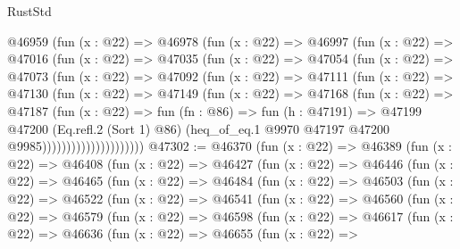 \begin{lexlean}{RustStd}
\begin{coremodule}
                @46959
                  (fun (x : @22) =>
                  @46978
                    (fun (x : @22) =>
                    @46997
                      (fun (x : @22) =>
                      @47016
                        (fun (x : @22) =>
                        @47035
                          (fun (x : @22) =>
                          @47054
                            (fun (x : @22) =>
                            @47073
                              (fun (x : @22) =>
                              @47092
                                (fun (x : @22) =>
                                @47111
                                  (fun (x : @22) =>
                                  @47130
                                    (fun (x : @22) =>
                                    @47149
                                      (fun (x : @22) =>
                                      @47168
                                        (fun (x : @22) =>
                                        @47187
                                          (fun (x : @22) =>
                                          fun (fn : @86) =>
                                          fun (h : @47191) =>
                                          @47199
                                            @47200
                                            (Eq.refl.{2} (Sort 1) @86)
                                            (heq_of_eq.{1}
                                              @9970
                                              @47197
                                              @47200
                                              @9985)))))))))))))))))))))
@47302 := @46370
    (fun (x : @22) =>
    @46389
      (fun (x : @22) =>
      @46408
        (fun (x : @22) =>
        @46427
          (fun (x : @22) =>
          @46446
            (fun (x : @22) =>
            @46465
              (fun (x : @22) =>
              @46484
                (fun (x : @22) =>
                @46503
                  (fun (x : @22) =>
                  @46522
                    (fun (x : @22) =>
                    @46541
                      (fun (x : @22) =>
                      @46560
                        (fun (x : @22) =>
                        @46579
                          (fun (x : @22) =>
                          @46598
                            (fun (x : @22) =>
                            @46617
                              (fun (x : @22) =>
                              @46636
                                (fun (x : @22) =>
                                @46655
                                  (fun (x : @22) =>

\end{coremodule}
\end{lexlean}
